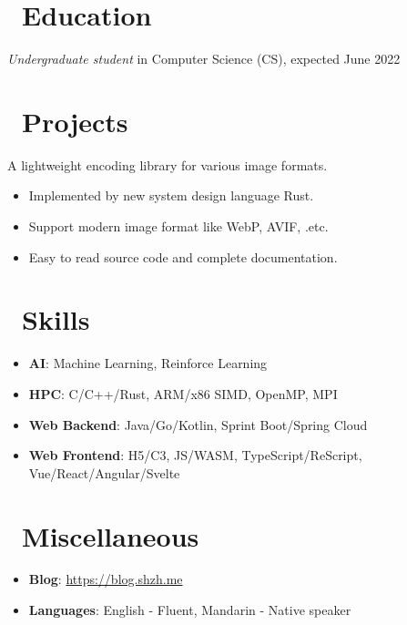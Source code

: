 \documentclass{common}
\begin{document}



\section{\faGraduationCap\ Education}
\textit{Undergraduate student} in Computer Science (CS), expected June 2022


\section{\faCubes\ Projects}
A lightweight encoding library for various image formats.
\begin{itemize}
  \item Implemented by new system design language Rust.
  \item Support modern image format like WebP, AVIF, .etc.
  \item Easy to read source code and complete documentation.
\end{itemize}

\section{\faCogs\ Skills}
\begin{itemize}[parsep=0.5ex]
  \item \textbf{AI}: Machine Learning, Reinforce Learning
  \item \textbf{HPC}: C/C++/Rust, ARM/x86 SIMD, OpenMP, MPI
  \item \textbf{Web Backend}: Java/Go/Kotlin, Sprint Boot/Spring Cloud
  \item \textbf{Web Frontend}: H5/C3, JS/WASM, TypeScript/ReScript, Vue/React/Angular/Svelte
\end{itemize}

\section{\faInfo\ Miscellaneous}
\begin{itemize}[parsep=0.5ex]
  \item \textbf{Blog}: \href{https://blog.shzh.me}{https://blog.shzh.me}
  \item \textbf{Languages}: English - Fluent, Mandarin - Native speaker
\end{itemize}
\end{document}
